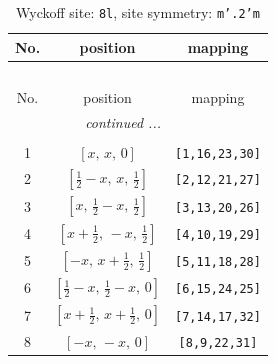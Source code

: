 \documentclass[fleqn,8pt]{jsarticle}
\begin{document}
\begin{longtable}{ccc}
\caption{Wyckoff site: {\tt 8l}, site symmetry: {\tt m'.2'm}}
 \\
 \hline \hline
No. & position & mapping \\ \hline \endfirsthead

\multicolumn{2}{l}{\tablename\ \thetable{}} \\
 \hline \hline
No. & position & mapping \\ \hline \endhead

 \hline \hline
\multicolumn{2}{r}{\footnotesize\it continued ...} \\ \endfoot

 \hline \hline
\multicolumn{2}{r}{} \\ \endlastfoot

1 & $\left[ x,\, x,\, 0 \right]$ & {\tt [1,16,23,30]} \\ \hline
2 & $\left[ \frac{1}{2} - x,\, x,\, \frac{1}{2} \right]$ & {\tt [2,12,21,27]} \\ \hline
3 & $\left[ x,\, \frac{1}{2} - x,\, \frac{1}{2} \right]$ & {\tt [3,13,20,26]} \\ \hline
4 & $\left[ x + \frac{1}{2},\, - x,\, \frac{1}{2} \right]$ & {\tt [4,10,19,29]} \\ \hline
5 & $\left[ - x,\, x + \frac{1}{2},\, \frac{1}{2} \right]$ & {\tt [5,11,18,28]} \\ \hline
6 & $\left[ \frac{1}{2} - x,\, \frac{1}{2} - x,\, 0 \right]$ & {\tt [6,15,24,25]} \\ \hline
7 & $\left[ x + \frac{1}{2},\, x + \frac{1}{2},\, 0 \right]$ & {\tt [7,14,17,32]} \\ \hline
8 & $\left[ - x,\, - x,\, 0 \right]$ & {\tt [8,9,22,31]} \\
\end{longtable}
\renewcommand{\arraystretch}{1.2}
\end{document}
